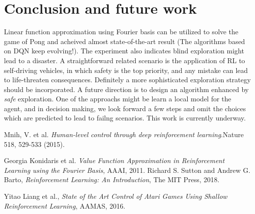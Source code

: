 \documentclass[12pt]{article}
\begin{document}
\section{Conclusion and future work}
Linear function approximation using Fourier basis can be utilized to
solve the game of Pong and acheived almost state\--of\--the\--art
result (The algorithms based on DQN keep evolving!). The experiment
also indicates blind exploration might lead to a disaster. A
straightforward related scenario is the application of RL to
self\--driving vehicles, in which safety is the top priority, and any
mistake can lead to life\--threaten consequences. Definitely a more
sophisticated exploration strategy should be incorporated. A future
direction is to design an algorithm enhanced by \textit{safe}
exploration. One of the approachs might be learn a local model for the
agent, and in decision making, we look forward a few steps and omit
the choices which are predicted to lead to failng scenarios. This work is
currently underway.

\begin{thebibliography}{9}
        Mnih, V. et al. \textit{Human-level control through
        deep reinforcement learning}.Nature 518, 529-533 (2015).

         Georgia Konidaris et al. \textit{Value Function Approximation in 
                        Reinforcement Learning using the Fourier Basis},  
                        AAAI, 2011.
         Richard S. Sutton and Andrew G. Barto, \textit{Reinforcement
         Learning: An Introduction}, The MIT Press, 2018.

         Yitao Liang et al., \textit{State of the Art Control of Atari
         Games Using Shallow Reinforcement Learning}, AAMAS, 2016.
\end{thebibliography}
\end{document}
